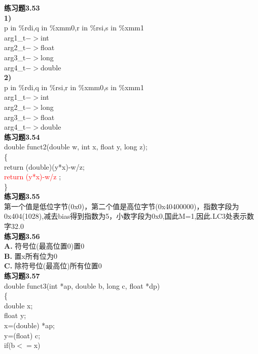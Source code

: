 \documentclass{article}
\newcommand{\red}[1]{\textcolor{red}{#1}}
\begin{document}
\begin{CJK}{UTF8}{uyhei}
\textbf{练习题3.53}	\\
\textbf{1)}	\\
p in \%rdi,q in \%xmm0,r in \%rsi,s in \%xmm1	\\
arg1\_t$->$int	\\
arg2\_t$->$float	\\
arg3\_t$->$long	\\
arg4\_t$->$double	\\
\textbf{2)}	\\
p in \%rdi,q in \%rsi,r in \%xmm0,s in \%xmm1	\\
arg1\_t$->$int	\\
arg2\_t$->$long	\\
arg3\_t$->$float	\\
arg4\_t$->$double	\\[3ex]
\textbf{练习题3.54}	\\
double funct2(double w, int x, float y, long z);	\\
\{	\\
	\hspace*{2em}return (double)(y*x)-w/z;	\\
	\hspace*{2em}\red{ return (y*x)-w/z };	\\
\}	\\[3ex]
\textbf{练习题3.55}	\\
第一个值是低位字节(0x0)，第二个值是高位字节(0x40400000)，指数字段为0x404(1028),减去bias得到指数为5，小数字段为0x0,国此M=1,因此.LC3处表示数字32.0	\\[3ex]
\newpage
\noindent\textbf{练习题3.56}	\\
\textbf{A.} 符号位(最高位置0)置0	\\
\textbf{B.} 置x所有位为0	\\
\textbf{C.} 除符号位(最高位)所有位置0	\\[3ex]
\textbf{练习题3.57}	\\
double funct3(int *ap, double b, long c, float *dp)	\\
\{	\\
	\hspace*{2em}double x;	\\
	\hspace*{2em}float y;	\\
	\hspace*{2em}x=(double) *ap;	\\
	\hspace*{2em}y=(float) c;	\\
	\hspace*{2em}if(b$<=$x)	\\

\end{CJK}
\end{document}
